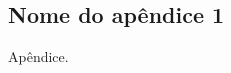 
\begin{apendicesenv}
\partapendices

\chapter{Nome do apêndice 1} %
\label{chap:apendiceA}

Apêndice.

\end{apendicesenv}
